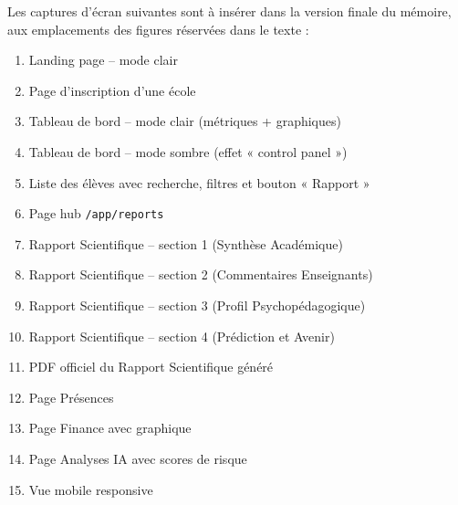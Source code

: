 \documentclass[12pt,a4paper,oneside]{report}
\begin{document}
Les captures d'écran suivantes sont à insérer dans la version finale du mémoire, aux emplacements des figures réservées dans le texte :

\begin{enumerate}
  \item Landing page -- mode clair
  \item Page d'inscription d'une école
  \item Tableau de bord -- mode clair (métriques + graphiques)
  \item Tableau de bord -- mode sombre (effet « control panel »)
  \item Liste des élèves avec recherche, filtres et bouton « Rapport »
  \item Page hub \texttt{/app/reports}
  \item Rapport Scientifique -- section 1 (Synthèse Académique)
  \item Rapport Scientifique -- section 2 (Commentaires Enseignants)
  \item Rapport Scientifique -- section 3 (Profil Psychopédagogique)
  \item Rapport Scientifique -- section 4 (Prédiction et Avenir)
  \item PDF officiel du Rapport Scientifique généré
  \item Page Présences
  \item Page Finance avec graphique
  \item Page Analyses IA avec scores de risque
  \item Vue mobile responsive
\end{enumerate}

\end{document}
